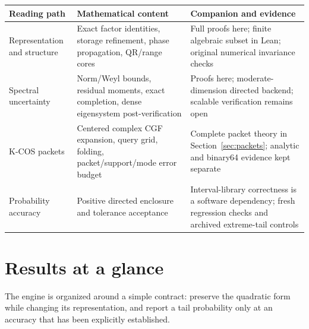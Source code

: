 \documentclass[11pt]{article}
\theoremstyle{definition}
\theoremstyle{remark}
\begin{document}
\begin{center}
\small
\begin{tabular}{@{}p{.23\linewidth}p{.33\linewidth}p{.35\linewidth}@{}}
\toprule
Reading path & Mathematical content & Companion and evidence\\
\midrule
Representation and structure & Exact factor identities, storage refinement,
phase propagation, QR/range cores & Full proofs here; finite algebraic subset
in Lean; original numerical invariance checks\\[2mm]
Spectral uncertainty & Norm/Weyl bounds, residual moments, exact completion,
dense eigensystem post-verification & Proofs here; moderate-dimension directed
backend; scalable verification remains open\\[2mm]
K-COS packets & Centered complex CGF expansion, query grid, folding,
packet/support/mode error budget & Complete packet theory in
Section~\ref{sec:packets}; analytic and binary64 evidence kept separate\\[2mm]
Probability accuracy & Positive directed enclosure and tolerance acceptance &
Interval-library correctness is a software dependency; fresh regression
checks and archived extreme-tail controls\\
\bottomrule
\end{tabular}
\end{center}

\tableofcontents
\clearpage

\section{Results at a glance}\label{sec:final-1}

The engine is organized around a simple contract: preserve the quadratic form
while changing its representation, and report a tail probability only at an
accuracy that has been explicitly established.
\end{document}
